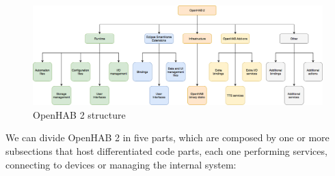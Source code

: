 \begin{figure}
	\centering
	\includegraphics[width=1\textwidth]{images/Chapter_06/openhab2-structure.png}
	\caption{OpenHAB 2 structure}
	\label{fig:openhab2-structure}
\end{figure}

We can divide OpenHAB 2 in five parts, which are composed by one or more subsections that host differentiated code parts, each one
performing services, connecting to devices or managing the internal system:

